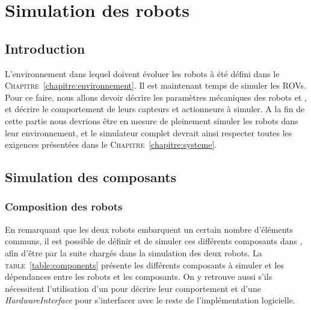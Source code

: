 \chapter{Simulation des robots}
\label{chapitre:robots}
	
	\section{Introduction}

		L'environnement dans lequel doivent évoluer les robots à été défini dans le \textsc{Chapitre}~\ref{chapitre:environnement}. Il est maintenant temps de simuler les \gls{ROV}s. Pour ce faire, nous allons devoir décrire les paramètres mécaniques des robots \argos{} et \atoll{}, et décrire le comportement de leurs capteurs et actionneurs à simuler. A la fin de cette partie nous devrions être en mesure de pleinement simuler les robots dans leur environnement, et le simulateur complet devrait ainsi respecter toutes les exigences présentées dans le \textsc{Chapitre}~\ref{chapitre:systeme}.

	\section{Simulation des composants}

		\subsection{Composition des robots}
			En remarquant que les deux robots embarquent un certain nombre d'éléments communs, il est possible de définir et de simuler ces différents composants dans \gazebo, afin d'être par la suite chargés dans la simulation des deux robots. La \textsc{table}~\ref{table:components} présente les différents composants à simuler et les dépendances entre les robots et les composants. On y retrouve aussi s'ils nécessitent l'utilisation d'un \plugin{} \gazebo{} pour décrire leur comportement et d'une \textit{HardwareInterface} pour s'interfacer avec le reste de l'implémentation logicielle.


